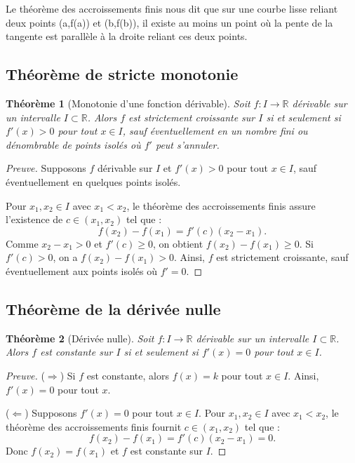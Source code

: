 \documentclass{report} %
\theoremstyle{definition}  %
\theoremstyle{plain} %
\newtheorem{theorem}{Théorème}[chapter]
\theoremstyle{remark} %
\begin{document}
\medskip

Le théorème des accroissements finis nous dit que sur une courbe lisse reliant deux points
(a,f(a)) et (b,f(b)), il existe au moins un point où la pente de la tangente 
est parallèle à la droite reliant ces deux points.

\medskip

\subsection{Théorème de stricte monotonie}

\begin{theorem}[Monotonie d'une fonction dérivable]
Soit \(f : I \to \mathbb{R}\) dérivable sur un intervalle \(I \subset \mathbb{R}\).  
Alors \(f\) est strictement croissante sur \(I\) si et seulement si \(f'(x) > 0\) pour tout \(x \in I\), sauf éventuellement en un nombre fini ou dénombrable de points isolés où \(f'\) peut s'annuler.
\end{theorem}

\medskip

\begin{proof}[Preuve]
Supposons \(f\) dérivable sur \(I\) et \(f'(x) > 0\) pour tout \(x \in I\), sauf éventuellement en quelques points isolés.  

Pour \(x_1, x_2 \in I\) avec \(x_1 < x_2\), le théorème des accroissements finis assure l'existence de \(c \in (x_1, x_2)\) tel que :
\[
f(x_2) - f(x_1) = f'(c)(x_2 - x_1).
\]
Comme \(x_2 - x_1 > 0\) et \(f'(c) \ge 0\), on obtient \(f(x_2) - f(x_1) \ge 0\).  
Si \(f'(c) > 0\), on a \(f(x_2) - f(x_1) > 0\).  
Ainsi, \(f\) est strictement croissante, sauf éventuellement aux points isolés où \(f' = 0\).
\end{proof}

\medskip

\subsection{Théorème de la dérivée nulle}

\begin{theorem}[Dérivée nulle]
Soit \(f : I \to \mathbb{R}\) dérivable sur un intervalle \(I \subset \mathbb{R}\).  
Alors \(f\) est constante sur \(I\) si et seulement si \(f'(x) = 0\) pour tout \(x \in I\).
\end{theorem}

\medskip

\begin{proof}[Preuve]
(\(\Rightarrow\)) Si \(f\) est constante, alors \(f(x) = k\) pour tout \(x \in I\).  
Ainsi, \(f'(x) = 0\) pour tout \(x\).

(\(\Leftarrow\)) Supposons \(f'(x) = 0\) pour tout \(x \in I\).  
Pour \(x_1, x_2 \in I\) avec \(x_1 < x_2\), le théorème des accroissements finis fournit \(c \in (x_1, x_2)\) tel que :
\[
f(x_2) - f(x_1) = f'(c)(x_2 - x_1) = 0.
\]
Donc \(f(x_2) = f(x_1)\) et \(f\) est constante sur \(I\).
\end{proof}
\end{document}
